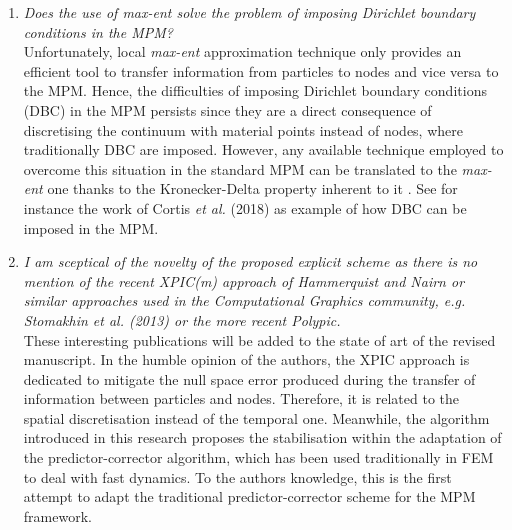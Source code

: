 \documentclass[12pt]{article}
\begin{document}
\begin{enumerate}
Concerning the first issue mentioned by the reviewer, the special case of non-convex domains was discussed by Arroyo \& Ortiz~\cite{Arroyo2006}. Some of the solutions proposed by the aforementioned authors are : the possibility of replacing the Euclidean distance $\lVert  x - x_a  \rVert$ in the definition of the shape functions by the length of the shortest path contained within the domain connecting $x$ and $x_a$. Or the decomposition of the non-convex domain into convex sub-domains.  This topic has also been extensively studied in the context of MLS-based meshfree methods, for instance visibility, diffraction, and constrained path criteria. These methods are directly applicable to local \textit{max-ent} approximation. 

\item \textit{Does the use of max-ent solve the problem of imposing Dirichlet boundary conditions in the MPM?}\\

Unfortunately, local \textit{max-ent} approximation technique only provides an efficient tool to transfer information from particles to nodes and vice versa to the MPM. Hence, the difficulties of imposing Dirichlet boundary conditions (DBC) in the MPM persists since they are a direct consequence of discretising the continuum with material points instead of nodes, where traditionally DBC are imposed. However, any available technique employed to overcome this situation in the standard MPM can be translated to the \textit{max-ent} one thanks to the Kronecker-Delta property inherent to it \cite{Arroyo2006}. See for instance the work of Cortis {\it et al.} (2018) \cite{Cortis_et_al_2017_IJNME} as example of how DBC can be imposed in the MPM.

\item \textit{I am sceptical of the novelty of the proposed explicit scheme as there is no mention of the recent XPIC(m) approach of Hammerquist and Nairn or similar approaches used in the Computational Graphics community, e.g. Stomakhin et al. (2013) or the more recent Polypic.}\\

These interesting publications will be added to the state of art of the revised manuscript. In the humble opinion of the authors, the XPIC approach is dedicated to mitigate the null space error produced during the transfer of information between particles and nodes. Therefore, it is related to the spatial discretisation instead of the temporal one. Meanwhile, the algorithm introduced in this research proposes the stabilisation within the adaptation of the predictor-corrector algorithm, which has been used traditionally in FEM to deal with fast dynamics. To the author\textquotesingle s knowledge, this is the first attempt to adapt the  traditional predictor-corrector scheme for the MPM framework. 

\end{enumerate}
\end{document}
